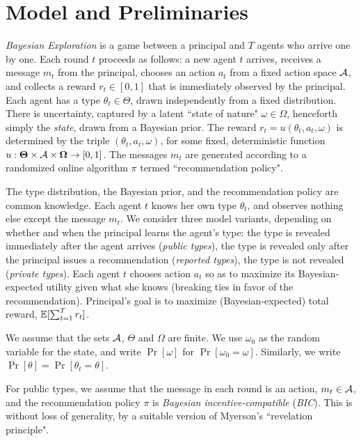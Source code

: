 \section{Model and Preliminaries}

\emph{Bayesian Exploration} is a game between a principal and $T$ agents who arrive one by one. Each round $t$ proceeds as follows: a new agent $t$ arrives, receives a message $m_t$ from the principal, chooses an action $a_t$ from a fixed action space $\mathcal{A}$, and collects a reward $r_t\in [0,1]$ that is immediately observed by the principal. Each agent has a type $\theta_t\in\varTheta$, drawn independently from a fixed distribution. There is uncertainty, captured by a latent ``state of nature" $\omega\in \varOmega$, henceforth simply the \emph{state}, drawn from a Bayesian prior. The reward $r_t = u(\theta_t,a_t,\omega)$ is determined by the triple $(\theta_t,a_t,\omega)$, for some fixed, deterministic function
    $u:\bold{\Theta}\times \mathcal{A} \times \bold{\Omega} \to [0,1]$.
The messages $m_t$ are generated according to a randomized online algorithm $\pi$ termed ``recommendation policy".

The type distribution, the Bayesian prior, and the recommendation policy are common knowledge. Each agent $t$ knows her own type $\theta_t$, and observes nothing else except the message $m_t$.  We consider three model variants, depending on whether and when the principal learns the agent's type: the type is revealed immediately after the agent arrives (\emph{public types}), the type is revealed only after the principal issues a recommendation (\emph{reported types}), the type is not revealed (\emph{private types}). Each agent $t$ chooses action $a_t$ so as to maximize its Bayesian-expected utility given what she knows (breaking ties in favor of the recommendation). Principal's goal is to maximize (Bayesian-expected) total reward, \ie $\mathbb{E}[\sum_{t=1}^T r_t]$.

We assume that the sets $\mathcal{A}$, $\varTheta$ and $\varOmega$ are finite. We use $\omega_0$ as the random variable for the state, and write $\Pr[\omega]$ for $\Pr[\omega_0=\omega]$. Similarly, we write $\Pr[\theta]=\Pr[\theta_t=\theta]$.

For public types, we assume that the message in each round is an action, \ie $m_t \in \mathcal{A}$, and the recommendation policy $\pi$ is {\em Bayesian incentive-compatible} (\emph{BIC}). This is without loss of generality, by a suitable version of Myerson's ``revelation principle".

